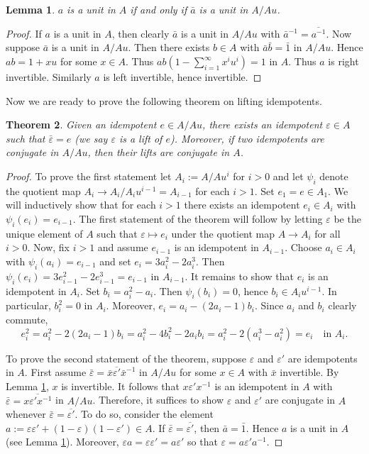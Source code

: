 \documentclass{amsart}
\newtheorem{theorem}{Theorem}[section]
\newtheorem{lemma}[theorem]{Lemma}
\theoremstyle{definition}
\renewcommand{\1}{_{(1)}}
\renewcommand{\2}{_{(2)}}
\newcommand{\3}{_{(3)}}
\newcommand{\4}{_{(4)}}
\newcommand{\ep}{\varepsilon}
\begin{document}
\begin{lemma}\label{invert}  $a$ is a unit in $A$ if and only if $\bar{a}$ is a unit in $A/Au$.
\end{lemma}

\begin{proof}  If $a$ is a unit in $A$, then clearly $\bar{a}$ is a unit in $A/Au$ with $\bar{a}^{-1}=\overline{a^{-1}}$.  Now suppose $\bar{a}$ is a unit in $A/Au$.  Then there exists $b\in A$ with $\bar{a}\bar{b}=\bar{1}$ in $A/Au$.  Hence $ab=1+xu$ for some $x\in A$.  Thus $ab\left(1-\sum_{i=1}^\infty x^iu^i\right)=1$ in $A$.  Thus $a$ is right invertible.  Similarly $a$ is left invertible, hence invertible.
\end{proof}

Now we are ready to prove the following theorem on lifting idempotents.

\begin{theorem}\label{appenlift}  Given an idempotent $e\in A/Au$, there exists an idempotent $\ep\in A$ such that $\bar{\ep}=e$ (we say $\ep$ is a lift of $e$).  Moreover, if two idempotents are conjugate in $A/Au$, then their lifts are conjugate in $A$.
\end{theorem}

\begin{proof} To prove the first statement let $A_i:=A/Au^i$ for $i>0$ and let $\psi_i$ denote the quotient map $A_i\to A_i/A_iu^{i-1}=A_{i-1}$ for each $i>1$.  Set $e_1=e\in A_1$.  We will inductively show that for each $i>1$ there exists an idempotent $e_i\in A_i$ with $\psi_i(e_i)=e_{i-1}$.  The first statement of the theorem will follow by letting $\ep$ be the unique element of $A$ such that $\ep\mapsto e_i$ under the quotient map $A\to A_i$ for all $i>0$.  Now, fix $i>1$ and assume $e_{i-1}$ is an idempotent in $A_{i-1}$.  Choose $a_i\in A_i$ with $\psi_i(a_i)=e_{i-1}$ and set $e_i=3a_i^2-2a^3_i$.  Then $\psi_i(e_i)=3e_{i-1}^2-2e_{i-1}^3=e_{i-1}$ in $A_{i-1}$.  It remains to show that $e_i$ is an idempotent in $A_i$.  Set $b_i=a_i^2-a_i$.  Then $\psi_i(b_i)=0$, hence $b_i\in A_iu^{i-1}$.  In particular, $b_i^2=0$ in $A_i$.  Moreover, $e_i=a_i-(2a_i-1)b_i$.  Since $a_i$ and $b_i$ clearly commute, $$e_i^2=a_i^2-2(2a_i-1)b_i=a_i^2-4b_i^2-2a_ib_i=a_i^2-2(a_i^3-a_i^2)=e_i\quad\text{in }A_i.$$

To prove the second statement of the theorem, suppose $\ep$ and $\ep'$ are idempotents in $A$.  First assume $\bar{\ep}=\bar{x}\overline{\ep'}\bar{x}^{-1}$ in $A/Au$ for some $x\in A$ with $\bar{x}$ invertible.  By Lemma \ref{invert}, $x$ is invertible.  
It follows that $x\ep'x^{-1}$ is an idempotent in $A$ with 
$\bar{\ep}=\overline{x\ep'x^{-1}}$ in $A/Au$.  Therefore, it suffices to show $\ep$ and $\ep'$ are conjugate in $A$ whenever $\bar{\ep}=\overline{\ep'}$.  To do so, consider the element $a:=\ep\ep'+(1-\ep)(1-\ep')\in A$.  If $\bar{\ep}=\overline{\ep'}$, then $\bar{a}=\bar{1}$.  Hence $a$ is a unit in $A$ (see Lemma \ref{invert}).  Moreover, $\ep a=\ep\ep'=a\ep'$ so that $\ep=a\ep'a^{-1}$.
\end{proof}










\renewcommand{\bibname}{\textsc{references}} 
	
	\addcontentsline{toc}{chapter}{\bibname}
			
\end{document}
